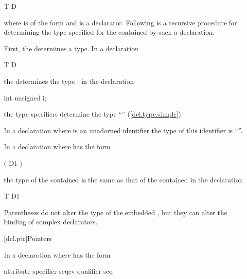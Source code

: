 \begin{codeblock}
T D
\end{codeblock}

where
is of the form 
and
is a declarator.
Following is a recursive procedure for determining
the type specified for the contained
by such a declaration.

\pnum
First, the
determines a type.
In a declaration

\begin{codeblock}
T D
\end{codeblock}

the
determines the type
.
\enterexample
in the declaration

\begin{codeblock}
int unsigned i;
\end{codeblock}

the type specifiers
determine the type
``''
(\ref{dcl.type.simple}).
\exitexample

\pnum
In a declaration
where
is an unadorned identifier the type of this identifier is
``''.

\pnum
In a declaration
where
has the form

\begin{ncsimplebnf}
( D1 )
\end{ncsimplebnf}

the type of the contained
is the same as that of the contained
in the declaration

\begin{codeblock}
T D1
\end{codeblock}

%
Parentheses do not alter the type of the embedded
,
but they can alter the binding of complex declarators.

[dcl.ptr]{Pointers}%
%

\pnum
In a declaration
where
has the form

\begin{ncsimplebnf}
\terminal{*} attribute-specifier-seq\opt cv-qualifier-seq\opt {}
\end{ncsimplebnf}

